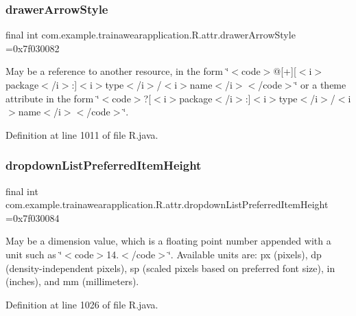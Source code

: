\subsubsection{\texorpdfstring{drawerArrowStyle}{drawerArrowStyle}}
{\footnotesize\ttfamily final int com.\+example.\+trainawearapplication.\+R.\+attr.\+drawer\+Arrow\+Style =0x7f030082\hspace{0.3cm}{\ttfamily [static]}}

May be a reference to another resource, in the form \char`\"{}$<$code$>$@\mbox{[}+\mbox{]}\mbox{[}$<$i$>$package$<$/i$>$\+:\mbox{]}$<$i$>$type$<$/i$>$/$<$i$>$name$<$/i$>$$<$/code$>$\char`\"{} or a theme attribute in the form \char`\"{}$<$code$>$?\mbox{[}$<$i$>$package$<$/i$>$\+:\mbox{]}$<$i$>$type$<$/i$>$/$<$i$>$name$<$/i$>$$<$/code$>$\char`\"{}. 

Definition at line 1011 of file R.\+java.

\mbox{\label{classcom_1_1example_1_1trainawearapplication_1_1_r_1_1attr_ad130e7ff32cdaaddf1b2541f0184b55f}} 
\subsubsection{\texorpdfstring{dropdownListPreferredItemHeight}{dropdownListPreferredItemHeight}}
{\footnotesize\ttfamily final int com.\+example.\+trainawearapplication.\+R.\+attr.\+dropdown\+List\+Preferred\+Item\+Height =0x7f030084\hspace{0.3cm}{\ttfamily [static]}}

May be a dimension value, which is a floating point number appended with a unit such as \char`\"{}$<$code$>$14.\+5sp$<$/code$>$\char`\"{}. Available units are\+: px (pixels), dp (density-\/independent pixels), sp (scaled pixels based on preferred font size), in (inches), and mm (millimeters). 

Definition at line 1026 of file R.\+java.

\mbox{\label{classcom_1_1example_1_1trainawearapplication_1_1_r_1_1attr_ada85901929c46d26a312372372fd8f3f}} 
